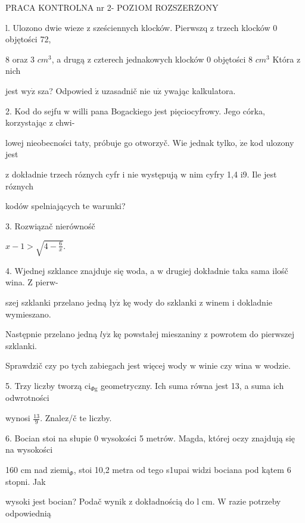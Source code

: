 \documentclass[a4paper,12pt]{article}
\begin{document}
PRACA KONTROLNA nr 2- POZ1OM ROZSZERZONY

l. Ulozono dwie wieze $\mathrm{z}$ sześciennych klocków. Pierwszq $\mathrm{z}$ trzech klocków $0$ objętości 72,

8 oraz 3 $cm^{3}$, a drugą $\mathrm{z}$ czterech jednakowych klocków $0$ objętości 8 $cm^{3}$ Która $\mathrm{z}$ nich

jest $\mathrm{w}\mathrm{y}\dot{\mathrm{z}}$ sza? Odpowied $\acute{\mathrm{z}}$ uzasadnič nie $\mathrm{u}\dot{\mathrm{z}}$ ywając kalkulatora.

2. Kod do sejfu $\mathrm{w}$ willi pana Bogackiego jest pięciocyfrowy. Jego córka, korzystając $\mathrm{z}$ chwi-

lowej nieobecności taty, próbuje go otworzyč. Wie jednak tylko, $\dot{\mathrm{z}}\mathrm{e}$ kod ulozony jest

$\mathrm{z}$ dokładnie trzech róznych cyfr $\mathrm{i}$ nie występują $\mathrm{w}$ nim cyfry 1,4 $\mathrm{i}9$. Ile jest róznych

kodów spelniających te warunki?

3. Rozwiązač nierównośč

$x-1>\sqrt{4-\frac{6}{x}}.$

4. Wjednej szklance znajduje się woda, a $\mathrm{w}$ drugiej dokładnie taka sama ilośč wina. $\mathrm{Z}$ pierw-

szej szklanki przelano jedną $\text{ł} \mathrm{y}\dot{\mathrm{z}}$ kę wody do szklanki $\mathrm{z}$ winem $\mathrm{i}$ dokladnie wymieszano.

Następnie przelano jedną $l\mathrm{y}\dot{\mathrm{z}}$ kę powstałej mieszaniny $\mathrm{z}$ powrotem do pierwszej szklanki.

Sprawdzič czy po tych zabiegach jest więcej wody $\mathrm{w}$ winie czy wina $\mathrm{w}$ wodzie.

5. Trzy liczby tworzą $\mathrm{c}\mathrm{i}_{\Phi \mathrm{g}}$ geometryczny. Ich suma równa jest 13, a suma ich odwrotności

wynosi $\displaystyle \frac{13}{9}$. Znalez/č te liczby.

6. Bocian stoi na słupie $0$ wysokości 5 metrów. Magda, której oczy znajdują się na wysokości

160 cm nad $\mathrm{z}\mathrm{i}\mathrm{e}\mathrm{m}\mathrm{i}_{\Phi}$, stoi 10,2 metra od tego s1upai widzi bociana pod kątem 6 stopni. Jak

wysoki jest bocian? Podač wynik $\mathrm{z}$ dokładnością do l cm. $\mathrm{W}$ razie potrzeby odpowiednią
\end{document}
